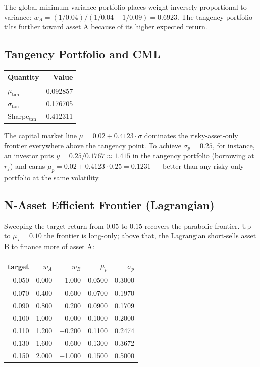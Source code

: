 The global minimum-variance portfolio places weight inversely
proportional to variance: $w_A = (1/0.04) / (1/0.04 + 1/0.09) = 0.6923$.
The tangency portfolio tilts further toward asset A because of its
higher expected return.

\subsection{Tangency Portfolio and CML}

\begin{center}
\begin{tabular}{lr}
\toprule
Quantity & Value \\
\midrule
$\mu_{\text{tan}}$     & 0.092857 \\
$\sigma_{\text{tan}}$  & 0.176705 \\
Sharpe$_{\text{tan}}$  & 0.412311 \\
\bottomrule
\end{tabular}
\end{center}

The capital market line $\mu = 0.02 + 0.4123 \cdot \sigma$ dominates the
risky-asset-only frontier everywhere above the tangency point. To achieve
$\sigma_p = 0.25$, for instance, an investor puts $y = 0.25 / 0.1767 \approx
1.415$ in the tangency portfolio (borrowing at $r_f$) and earns
$\mu_p = 0.02 + 0.4123 \cdot 0.25 = 0.1231$ --- better than any risky-only
portfolio at the same volatility.

\subsection{N-Asset Efficient Frontier (Lagrangian)}

Sweeping the target return from $0.05$ to $0.15$ recovers the parabolic
frontier. Up to $\mu_\star = 0.10$ the frontier is long-only; above that,
the Lagrangian short-sells asset B to finance more of asset A:

\begin{center}
\begin{tabular}{rrrrr}
\toprule
target & $w_A$ & $w_B$ & $\mu_p$ & $\sigma_p$ \\
\midrule
0.050 &  0.000 &  1.000 & 0.0500 & 0.3000 \\
0.070 &  0.400 &  0.600 & 0.0700 & 0.1970 \\
0.090 &  0.800 &  0.200 & 0.0900 & 0.1709 \\
0.100 &  1.000 &  0.000 & 0.1000 & 0.2000 \\
0.110 &  1.200 & $-$0.200 & 0.1100 & 0.2474 \\
0.130 &  1.600 & $-$0.600 & 0.1300 & 0.3672 \\
0.150 &  2.000 & $-$1.000 & 0.1500 & 0.5000 \\
\bottomrule
\end{tabular}
\end{center}

